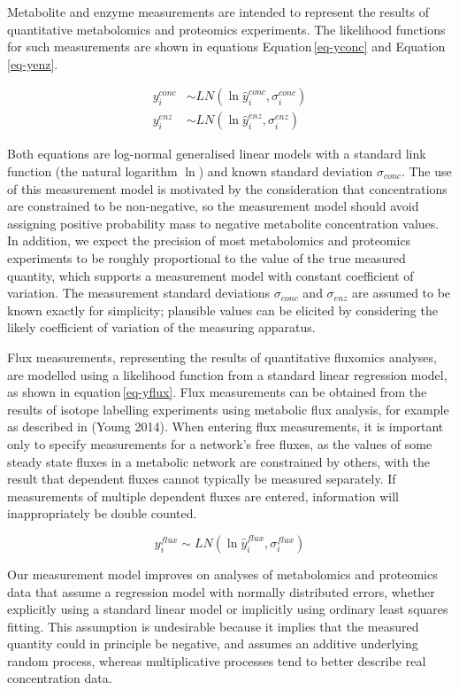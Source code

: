 \documentclass[journal=asbcd6,manuscript=article,layout=traditional]{achemso}
\begin{document}
Metabolite and enzyme measurements are intended to represent the results
of quantitative metabolomics and proteomics experiments. The likelihood
functions for such measurements are shown in equations
Equation\,\eqref{eq-yconc} and Equation\,\eqref{eq-yenz}.

\begin{align}
y_i^{conc} &\sim LN(\ln{\hat{y}_i^{conc}}, \sigma_i^{conc})\label{eq-yconc} \\
y_i^{enz} &\sim LN(\ln{\hat{y}_i^{enz}}, \sigma_i^{enz})\label{eq-yenz}
\end{align}

Both equations are log-normal generalised linear models with a standard
link function (the natural logarithm \(\ln\)) and known standard
deviation \(\sigma_{𝑐𝑜𝑛𝑐}\). The use of this measurement model is
motivated by the consideration that concentrations are constrained to be
non-negative, so the measurement model should avoid assigning positive
probability mass to negative metabolite concentration values. In
addition, we expect the precision of most metabolomics and proteomics
experiments to be roughly proportional to the value of the true measured
quantity, which supports a measurement model with constant coefficient
of variation. The measurement standard deviations \(\sigma_{𝑐𝑜𝑛𝑐}\) and
\(\sigma_{𝑒𝑛𝑧}\) are assumed to be known exactly for simplicity;
plausible values can be elicited by considering the likely coefficient
of variation of the measuring apparatus.

Flux measurements, representing the results of quantitative fluxomics
analyses, are modelled using a likelihood function from a standard
linear regression model, as shown in equation\,\eqref{eq-yflux}. Flux
measurements can be obtained from the results of isotope labelling
experiments using metabolic flux analysis, for example as described in
(Young 2014). When entering flux measurements, it is important only to
specify measurements for a network's free fluxes, as the values of some
steady state fluxes in a metabolic network are constrained by others,
with the result that dependent fluxes cannot typically be measured
separately. If measurements of multiple dependent fluxes are entered,
information will inappropriately be double counted.

\begin{equation}
y_i^{flux} \sim LN(\ln{\hat{y}_i^{flux}}, \sigma_i^{flux})\label{eq-yflux}
\end{equation}

Our measurement model improves on analyses of metabolomics and
proteomics data that assume a regression model with normally distributed
errors, whether explicitly using a standard linear model or implicitly
using ordinary least squares fitting. This assumption is undesirable
because it implies that the measured quantity could in principle be
negative, and assumes an additive underlying random process, whereas
multiplicative processes tend to better describe real concentration
data.
\end{document}

